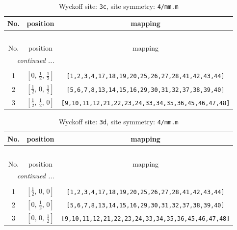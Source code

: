 \documentclass[fleqn,8pt]{jsarticle}
\begin{document}
\renewcommand{\arraystretch}{1.2}
\begin{longtable}{ccc}
\caption{Wyckoff site: {\tt 3c}, site symmetry: {\tt 4/mm.m}}
 \\
 \hline \hline
No. & position & mapping \\ \hline \endfirsthead

\multicolumn{2}{l}{\tablename\ \thetable{}} \\
 \hline \hline
No. & position & mapping \\ \hline \endhead

 \hline \hline
\multicolumn{2}{r}{\footnotesize\it continued ...} \\ \endfoot

 \hline \hline
\multicolumn{2}{r}{} \\ \endlastfoot

1 & $\left[ 0,\, \frac{1}{2},\, \frac{1}{2} \right]$ & {\tt [1,2,3,4,17,18,19,20,25,26,27,28,41,42,43,44]} \\ \hline
2 & $\left[ \frac{1}{2},\, 0,\, \frac{1}{2} \right]$ & {\tt [5,6,7,8,13,14,15,16,29,30,31,32,37,38,39,40]} \\ \hline
3 & $\left[ \frac{1}{2},\, \frac{1}{2},\, 0 \right]$ & {\tt [9,10,11,12,21,22,23,24,33,34,35,36,45,46,47,48]} \\
\end{longtable}
\renewcommand{\arraystretch}{1.2}
\begin{longtable}{ccc}
\caption{Wyckoff site: {\tt 3d}, site symmetry: {\tt 4/mm.m}}
 \\
 \hline \hline
No. & position & mapping \\ \hline \endfirsthead

\multicolumn{2}{l}{\tablename\ \thetable{}} \\
 \hline \hline
No. & position & mapping \\ \hline \endhead

 \hline \hline
\multicolumn{2}{r}{\footnotesize\it continued ...} \\ \endfoot

 \hline \hline
\multicolumn{2}{r}{} \\ \endlastfoot

1 & $\left[ \frac{1}{2},\, 0,\, 0 \right]$ & {\tt [1,2,3,4,17,18,19,20,25,26,27,28,41,42,43,44]} \\ \hline
2 & $\left[ 0,\, \frac{1}{2},\, 0 \right]$ & {\tt [5,6,7,8,13,14,15,16,29,30,31,32,37,38,39,40]} \\ \hline
3 & $\left[ 0,\, 0,\, \frac{1}{2} \right]$ & {\tt [9,10,11,12,21,22,23,24,33,34,35,36,45,46,47,48]} \\
\end{longtable}
\end{document}
